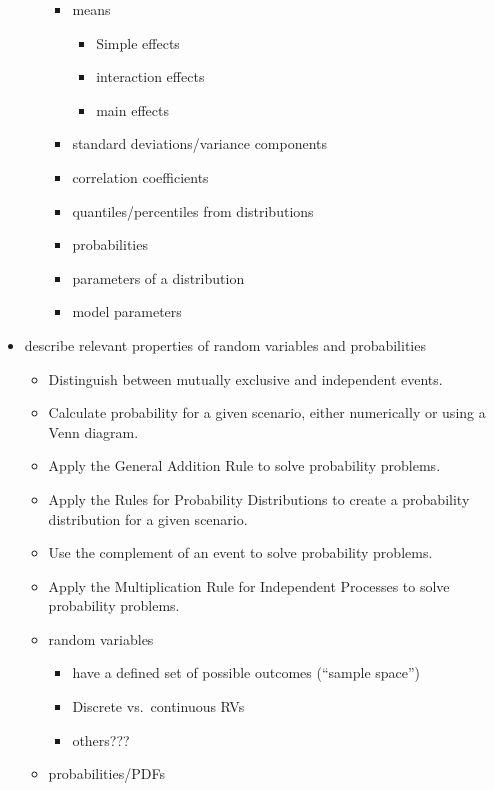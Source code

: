 \documentclass[]{book}
\providecommand{\tightlist}{%
  \setlength{\itemsep}{0pt}\setlength{\parskip}{0pt}}
\theoremstyle{definition}
\theoremstyle{definition}
\theoremstyle{definition}
\theoremstyle{remark}
\begin{document}
\begin{itemize}
\begin{itemize}
    \begin{itemize}
    \tightlist
    \item
      means

      \begin{itemize}
      \tightlist
      \item
        Simple effects
      \item
        interaction effects
      \item
        main effects
      \end{itemize}
    \item
      standard deviations/variance components
    \item
      correlation coefficients
    \item
      quantiles/percentiles from distributions
    \item
      probabilities
    \item
      parameters of a distribution
    \item
      model parameters
    \end{itemize}
  \end{itemize}
\item
  describe relevant properties of random variables and probabilities

  \begin{itemize}
  \tightlist
  \item
    Distinguish between mutually exclusive and independent events.
  \item
    Calculate probability for a given scenario, either numerically or
    using a Venn diagram.
  \item
    Apply the General Addition Rule to solve probability problems.
  \item
    Apply the Rules for Probability Distributions to create a
    probability distribution for a given scenario.
  \item
    Use the complement of an event to solve probability problems.
  \item
    Apply the Multiplication Rule for Independent Processes to solve
    probability problems.
  \item
    random variables

    \begin{itemize}
    \tightlist
    \item
      have a defined set of possible outcomes (``sample space'')
    \item
      Discrete vs.~continuous RVs
    \item
      others???
    \end{itemize}
  \item
    probabilities/PDFs


\end{itemize}
\end{itemize}
\end{document}
